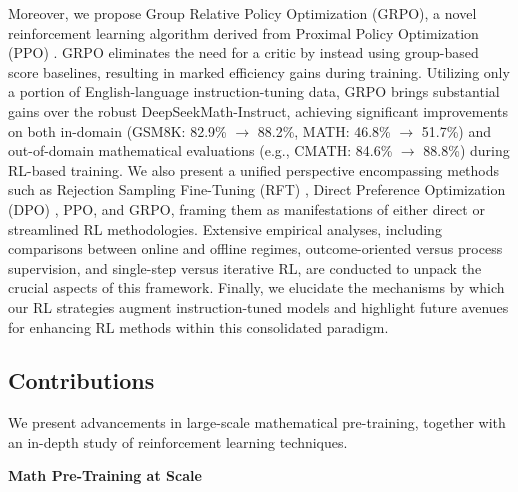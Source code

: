 Moreover, we propose Group Relative Policy Optimization (GRPO), a novel reinforcement learning algorithm derived from Proximal Policy Optimization (PPO) \citep{schulman2017proximal}. GRPO eliminates the need for a critic by instead using group-based score baselines, resulting in marked efficiency gains during training. Utilizing only a portion of English-language instruction-tuning data, GRPO brings substantial gains over the robust DeepSeekMath-Instruct, achieving significant improvements on both in-domain (GSM8K: 82.9\% $\rightarrow$ 88.2\%, MATH: 46.8\% $\rightarrow$ 51.7\%) and out-of-domain mathematical evaluations (e.g., CMATH: 84.6\% $\rightarrow$ 88.8\%) during RL-based training. We also present a unified perspective encompassing methods such as Rejection Sampling Fine-Tuning (RFT) \citep{yuan2023scaling}, Direct Preference Optimization (DPO) \citep{dpo}, PPO, and GRPO, framing them as manifestations of either direct or streamlined RL methodologies. Extensive empirical analyses, including comparisons between online and offline regimes, outcome-oriented versus process supervision, and single-step versus iterative RL, are conducted to unpack the crucial aspects of this framework. Finally, we elucidate the mechanisms by which our RL strategies augment instruction-tuned models and highlight future avenues for enhancing RL methods within this consolidated paradigm.

\subsection{Contributions}
We present advancements in large-scale mathematical pre-training, together with an in-depth study of reinforcement learning techniques.

\textbf{Math Pre-Training at Scale}

